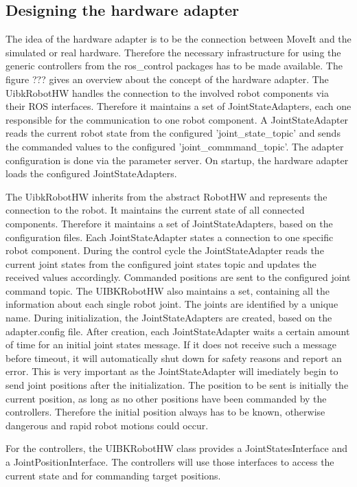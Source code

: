 \subsection{Designing the hardware adapter}

The idea of the hardware adapter is to be the connection between MoveIt and the simulated or real hardware. Therefore the necessary infrastructure for using the generic controllers from the ros\_control packages has to be made available. The figure ??? gives an overview about the concept of the hardware adapter. The UibkRobotHW handles the connection to the involved robot components via their ROS interfaces. Therefore it maintains a set of JointStateAdapters, each one responsible for the communication to one robot component. A JointStateAdapter reads the current robot state from the configured 'joint\_state\_topic' and sends the commanded values to the configured 'joint\_commmand\_topic'. The adapter configuration is done via the parameter server. On startup, the hardware adapter loads the configured JointStateAdapters.

The UibkRobotHW inherits from the abstract RobotHW and represents the connection to the robot. It maintains the current state of all connected components. Therefore it maintains a set of JointStateAdapters, based on the configuration files. Each JointStateAdapter states a connection to one specific robot component. During the control cycle the JointStateAdapter reads the current joint states from the configured joint states topic and updates the received values accordingly. Commanded positions are sent to the configured joint command topic. The UIBKRobotHW also maintains a set, containing all the information about each single robot joint. The joints are identified by a unique name. During initialization, the JointStateAdapters are created, based on the adapter.config file. After creation, each JointStateAdapter waits a certain amount of time for an initial joint states message. If it does not receive such a message before timeout, it will automatically shut down for safety reasons and report an error. This is very important as the JointStateAdapter will imediately begin to send joint positions after the initialization. The position to be sent is initially the current position, as long as no other positions have been commanded by the controllers. Therefore the initial position always has to be known, otherwise dangerous and rapid robot motions could occur.

For the controllers, the UIBKRobotHW class provides a JointStatesInterface and a JointPositionInterface. The controllers will use those interfaces to access the current state and for commanding target positions.

